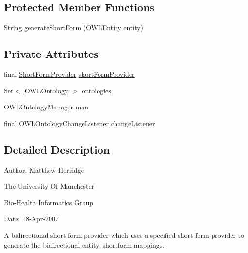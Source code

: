 \subsection*{Protected Member Functions}
\begin{DoxyCompactItemize}
\item 
String \hyperlink{classorg_1_1semanticweb_1_1owlapi_1_1util_1_1_bidirectional_short_form_provider_adapter_a4f47746de5b998d43a7e5f4fff830862}{generate\-Short\-Form} (\hyperlink{interfaceorg_1_1semanticweb_1_1owlapi_1_1model_1_1_o_w_l_entity}{O\-W\-L\-Entity} entity)
\end{DoxyCompactItemize}
\subsection*{Private Attributes}
\begin{DoxyCompactItemize}
\item 
final \hyperlink{interfaceorg_1_1semanticweb_1_1owlapi_1_1util_1_1_short_form_provider}{Short\-Form\-Provider} \hyperlink{classorg_1_1semanticweb_1_1owlapi_1_1util_1_1_bidirectional_short_form_provider_adapter_aa3e80e8a25ea65e954c93133e732697a}{short\-Form\-Provider}
\item 
Set$<$ \hyperlink{interfaceorg_1_1semanticweb_1_1owlapi_1_1model_1_1_o_w_l_ontology}{O\-W\-L\-Ontology} $>$ \hyperlink{classorg_1_1semanticweb_1_1owlapi_1_1util_1_1_bidirectional_short_form_provider_adapter_aebe65c23a11948662323fde93cbd9b0c}{ontologies}
\item 
\hyperlink{interfaceorg_1_1semanticweb_1_1owlapi_1_1model_1_1_o_w_l_ontology_manager}{O\-W\-L\-Ontology\-Manager} \hyperlink{classorg_1_1semanticweb_1_1owlapi_1_1util_1_1_bidirectional_short_form_provider_adapter_a67543d268bab8b7417456239323dbea9}{man}
\item 
final \hyperlink{interfaceorg_1_1semanticweb_1_1owlapi_1_1model_1_1_o_w_l_ontology_change_listener}{O\-W\-L\-Ontology\-Change\-Listener} \hyperlink{classorg_1_1semanticweb_1_1owlapi_1_1util_1_1_bidirectional_short_form_provider_adapter_a333dacfba3a2c030b4c9c5f17f0400e0}{change\-Listener}
\end{DoxyCompactItemize}


\subsection{Detailed Description}
Author\-: Matthew Horridge\par
 The University Of Manchester\par
 Bio-\/\-Health Informatics Group\par
 Date\-: 18-\/\-Apr-\/2007\par
 \par
 A bidirectional short form provider which uses a specified short form provider to generate the bidirectional entity--shortform mappings. 

